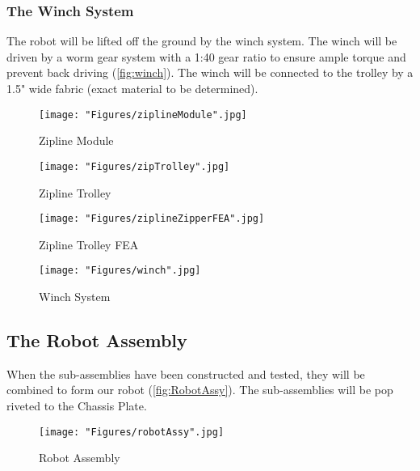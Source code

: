 \documentclass[11pt, oneside]{article} %
\begin{document}
		\subsubsection{The Winch System}
		The robot will be lifted off the ground by the winch system. The winch will be driven by a worm gear system with a 1:40 gear ratio to ensure ample torque and prevent back driving (\autoref{fig:winch}). The winch will be connected to the trolley by a 1.5" wide fabric (exact material to be determined). 
		
		\begin{figure}[h]
			\centering
			\begin{minipage}[t]{.5\textwidth}
				\centering
				\texttt{[image: "Figures/ziplineModule".jpg]}
				\caption[Zipline Module]{Zipline Module}
				\label{fig:zipModule}
			\end{minipage}%
			\begin{minipage}[t]{.5\textwidth}
				\centering
				\texttt{[image: "Figures/zipTrolley".jpg]}
				\caption[Zipline Trolley]{Zipline Trolley}
				\label{fig:zipTrolley}
			\end{minipage}
		\end{figure}	
		
		\begin{figure}[h]
			\centering
			\begin{minipage}[t]{.5\textwidth}
				\centering
				\texttt{[image: "Figures/ziplineZipperFEA".jpg]}
				\caption[Zipline Trolley FEA]{Zipline Trolley FEA}
				\label{fig:zipFEA}
			\end{minipage}%
			\begin{minipage}[t]{.5\textwidth}
				\centering
				\texttt{[image: "Figures/winch".jpg]}
				\caption[WinchSystem]{Winch System}
				\label{fig:winch}
			\end{minipage}
		\end{figure}
	
	\newpage
	\subsection{The Robot Assembly}
	When the sub-assemblies have been constructed and tested, they will be combined to form our robot (\autoref{fig:RobotAssy}). The sub-assemblies will be pop riveted to the Chassis Plate.
	
	\begin{figure}[h]
		\centering
		\texttt{[image: "Figures/robotAssy".jpg]}
		\caption[Robot Assembly]{Robot Assembly}
		\label{fig:RobotAssy}
	\end{figure}
	
\end{document}
